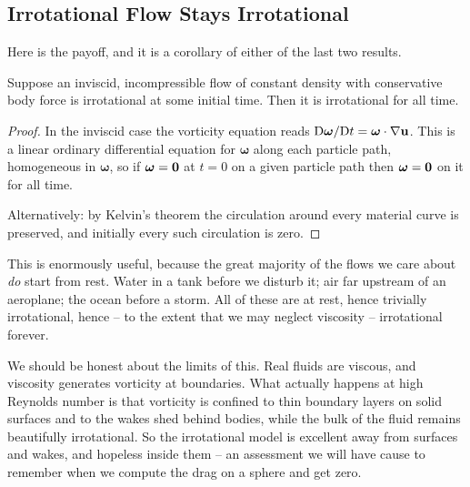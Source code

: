 \documentclass[a4paper]{scrartcl}
\newcommand{\D}{\mathrm{D}}
\newcommand{\bom}{\boldsymbol{\omega}}
\begin{document}
\subsection{Irrotational Flow Stays Irrotational}

Here is the payoff, and it is a corollary of either of the last two results.

\begin{corollary}
	Suppose an inviscid, incompressible flow of constant density with conservative body force is irrotational at some initial time. Then it is irrotational for all time.
\end{corollary}
\begin{proof}
	In the inviscid case the vorticity equation reads $\D\bom/\D t = \bom\cdot\nabla\vv u$. This is a linear ordinary differential equation for $\bom$ along each particle path, homogeneous in $\bom$, so if $\bom = \vv 0$ at $t = 0$ on a given particle path then $\bom = \vv 0$ on it for all time.

	Alternatively: by Kelvin's theorem the circulation around every material curve is preserved, and initially every such circulation is zero. \qedhere
\end{proof}

This is enormously useful, because the great majority of the flows we care about \emph{do} start from rest. Water in a tank before we disturb it; air far upstream of an aeroplane; the ocean before a storm. All of these are at rest, hence trivially irrotational, hence -- to the extent that we may neglect viscosity -- irrotational forever.

We should be honest about the limits of this. Real fluids are viscous, and viscosity generates vorticity at boundaries. What actually happens at high Reynolds number is that vorticity is confined to thin boundary layers on solid surfaces and to the wakes shed behind bodies, while the bulk of the fluid remains beautifully irrotational. So the irrotational model is excellent away from surfaces and wakes, and hopeless inside them -- an assessment we will have cause to remember when we compute the drag on a sphere and get zero.

\begin{center}
\end{center}
\end{document}
